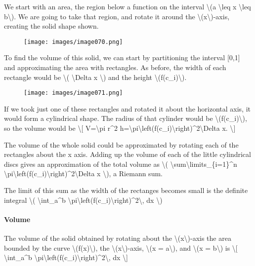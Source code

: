 We start with an area, the region below a function on the interval
\textbackslash{}(a \textbackslash{}leq x \textbackslash{}leq
b\textbackslash{}). We are going to take that region, and rotate it
around the \textbackslash{}(x\textbackslash{})-axis, creating the solid
shape shown.

\begin{figure}
\centering
\texttt{[image: images/image070.png]}
\caption{}
\end{figure}

To find the volume of this solid, we can start by partitioning the
interval {[}0,1{]} and approximating the area with rectangles. As
before, the width of each rectangle would be \textbackslash{}(
\textbackslash{}Delta x \textbackslash{}) and the height
\textbackslash{}(f(c\_i)\textbackslash{}).

\begin{figure}
\centering
\texttt{[image: images/image071.png]}
\caption{}
\end{figure}

If we took just one of these rectangles and rotated it about the
horizontal axis, it would form a cylindrical shape. The radius of that
cylinder would be \textbackslash{}(f(c\_i)\textbackslash{}), so the
volume would be \textbackslash{}{[} V=\textbackslash{}pi r\^{}2
h=\textbackslash{}pi\textbackslash{}left(f(c\_i)\textbackslash{}right)\^{}2\textbackslash{}Delta
x. \textbackslash{}{]}

The volume of the whole solid could be approximated by rotating each of
the rectangles about the x axis. Adding up the volume of each of the
little cylindrical discs gives an approximation of the total volume as
\textbackslash{}(
\textbackslash{}sum\textbackslash{}limits\_\{i=1\}\^{}n
\textbackslash{}pi\textbackslash{}left(f(c\_i)\textbackslash{}right)\^{}2\textbackslash{}Delta
x \textbackslash{}), a Riemann sum.

The limit of this sum as the width of the rectanges becomes small is the
definite integral \textbackslash{}( \textbackslash{}int\_a\^{}b
\textbackslash{}pi\textbackslash{}left(f(c\_i)\textbackslash{}right)\^{}2\textbackslash{},
dx \textbackslash{})

\hypertarget{volume-1}{%
\paragraph{Volume}\label{volume-1}}

The volume of the solid obtained by rotating about the
\textbackslash{}(x\textbackslash{})-axis the area bounded by the curve
\textbackslash{}(f(x)\textbackslash{}), the
\textbackslash{}(x\textbackslash{})-axis, \textbackslash{}(x =
a\textbackslash{}), and \textbackslash{}(x = b\textbackslash{}) is
\textbackslash{}{[} \textbackslash{}int\_a\^{}b
\textbackslash{}pi\textbackslash{}left(f(c\_i)\textbackslash{}right)\^{}2\textbackslash{},
dx \textbackslash{}{]}

